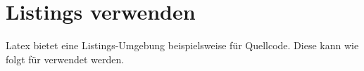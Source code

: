 \chapter{Listings verwenden}
\label{cap:listings}
\thispagestyle{fancy}

Latex bietet eine Listings-Umgebung beispielsweise für Quellcode. Diese kann wie folgt für  verwendet werden.



